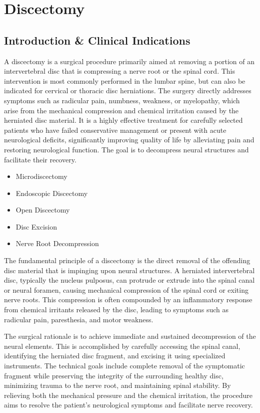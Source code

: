 \chapter{Discectomy}

\section*{Introduction \& Clinical Indications}
A discectomy is a surgical procedure primarily aimed at removing a portion of an intervertebral disc that is compressing a nerve root or the spinal cord. This intervention is most commonly performed in the lumbar spine, but can also be indicated for cervical or thoracic disc herniations. The surgery directly addresses symptoms such as radicular pain, numbness, weakness, or myelopathy, which arise from the mechanical compression and chemical irritation caused by the herniated disc material. It is a highly effective treatment for carefully selected patients who have failed conservative management or present with acute neurological deficits, significantly improving quality of life by alleviating pain and restoring neurological function. The goal is to decompress neural structures and facilitate their recovery.

\begin{itemize}
  \item Microdiscectomy
  \item Endoscopic Discectomy
  \item Open Discectomy
  \item Disc Excision
  \item Nerve Root Decompression
\end{itemize}

The fundamental principle of a discectomy is the direct removal of the offending disc material that is impinging upon neural structures. A herniated intervertebral disc, typically the nucleus pulposus, can protrude or extrude into the spinal canal or neural foramen, causing mechanical compression of the spinal cord or exiting nerve roots. This compression is often compounded by an inflammatory response from chemical irritants released by the disc, leading to symptoms such as radicular pain, paresthesia, and motor weakness.

The surgical rationale is to achieve immediate and sustained decompression of the neural elements. This is accomplished by carefully accessing the spinal canal, identifying the herniated disc fragment, and excising it using specialized instruments. The technical goals include complete removal of the symptomatic fragment while preserving the integrity of the surrounding healthy disc, minimizing trauma to the nerve root, and maintaining spinal stability. By relieving both the mechanical pressure and the chemical irritation, the procedure aims to resolve the patient's neurological symptoms and facilitate nerve recovery.

